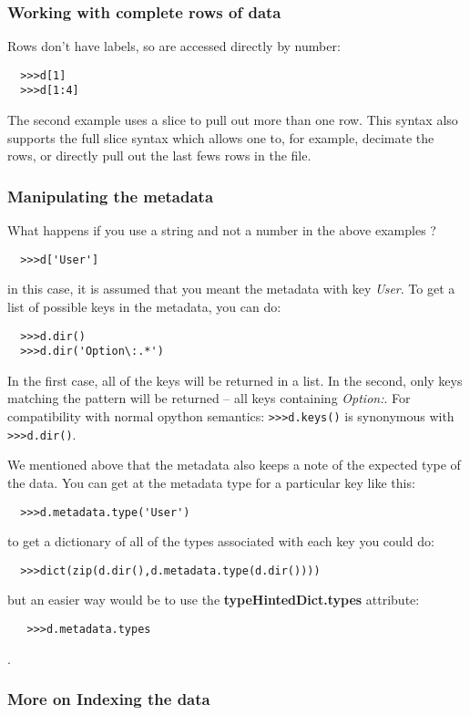 \documentclass[a4paper,11pt]{scrartcl}
\begin{document}
\subsubsection{Working with complete rows of data}

Rows don't have labels, so are accessed directly by number:
\begin{verbatim}
  >>>d[1]
  >>>d[1:4]
\end{verbatim}
The second example uses a slice to pull out more than one row. This syntax also
supports the full slice syntax which allows one to, for example, decimate the
rows, or directly pull out the last fews rows in the file.

\subsubsection{Manipulating the metadata}

What happens if you use a string and not a number in the above examples ?
\begin{verbatim}
  >>>d['User']
\end{verbatim}
in this case, it is assumed that you meant the metadata with key \textit{User}.
To get a list of possible keys in the metadata, you can do:
\begin{verbatim}
  >>>d.dir()
  >>>d.dir('Option\:.*')
\end{verbatim}
In the first case, all of the keys will be returned in a list. In the second,
only keys matching the pattern will be returned -- all keys containing
\textit{Option:}. For compatibility with normal opython semantics: \verb#>>>d.keys()# is
synonymous with \verb#>>>d.dir()#.

We mentioned above that the metadata also keeps a note of the expected type of
the data. You can get at the metadata type for a particular key like this:
\begin{verbatim}
  >>>d.metadata.type('User')
\end{verbatim}
to get a dictionary of all of the types associated with each key you could do:
\begin{verbatim}
  >>>dict(zip(d.dir(),d.metadata.type(d.dir())))
\end{verbatim}
but an easier way would be to use the \textbf{typeHintedDict.types} attribute:
\begin{verbatim}
   >>>d.metadata.types
\end{verbatim}
.

\subsubsection{More on Indexing the data}
\end{document}
